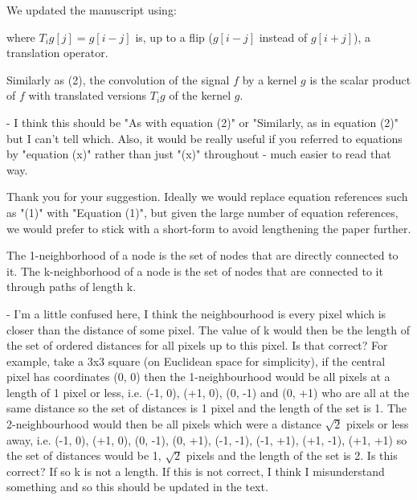 \documentclass[12pt,a4paper]{article}
\newcommand{\nati}[1]{{\color[rgb]{.1,.6,.1}{NP: #1}}}
\newcommand{\todo}[1]{{\color[rgb]{.6,.1,.6}{TODO: #1}}}
\newcommand{\1}{\b{1}}              %
\newcommand{\0}{\b{0}}              %
\begin{document}
We updated the manuscript using:
\begin{mdframed}[style=manuscript]
where $T_i g[j] = g[i-j]$ is, up to a flip ($g[i-j]$ instead of $g[i+j]$), a translation operator.
\end{mdframed}

\begin{mdframed}[style=comment]
Similarly as (2), the convolution of the signal $f$ by a kernel $g$ is the scalar product of $f$ with translated versions $T_ig$ of the kernel $g$.

- I think this should be "As with equation (2)" or "Similarly, as in equation (2)" but I can't tell which. Also, it would be really useful if you referred to equations by "equation (x)" rather than just "(x)" throughout - much easier to read that way.
\end{mdframed}
Thank you for your suggestion. Ideally we would replace equation references such as "(1)" with "Equation (1)", but given the large number of equation references, we would prefer to stick with a short-form to avoid lengthening the paper further.

\begin{mdframed}[style=comment]
The 1-neighborhood of a node is the set of nodes that are directly connected to it. The k-neighborhood of a node is the set of nodes that are connected to it through paths of length k.

- I'm a little confused here, I think the neighbourhood is every pixel which is closer than the distance of some pixel. The value of k would then be the length of the set of ordered distances for all pixels up to this pixel. Is that correct? For example, take a 3x3 square (on Euclidean space for simplicity), if the central pixel has coordinates (0, 0) then the 1-neighbourhood would be all pixels at a length of 1 pixel or less, i.e. (-1, 0), (+1, 0), (0, -1) and (0, +1) who are all at the same distance so the set of distances is {1} pixel and the length of the set is 1. The 2-neighbourhood would then be all pixels which were a distance $\sqrt{2}$ pixels or less away, i.e. (-1, 0), (+1, 0), (0, -1), (0, +1), (-1, -1), (-1, +1), (+1, -1), (+1, +1) so the set of distances would be {1, $\sqrt{2}$} pixels and the length of the set is 2. Is this correct? If so k is not a length. If this is not correct, I think I misunderstand something and so this should be updated in the text.
\end{mdframed}
\todo{Assigned: @michael}
\end{document}
